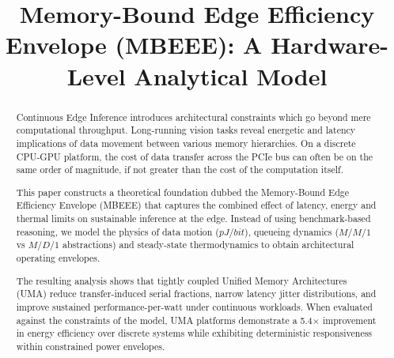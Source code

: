 \documentclass[conference]{IEEEtran}
\begin{document}
\title{Memory-Bound Edge Efficiency Envelope (MBEEE): A Hardware-Level Analytical Model}

\author{
}

\maketitle

\begin{abstract}
Continuous Edge Inference introduces architectural constraints which go beyond mere computational throughput. Long-running vision tasks reveal energetic and latency implications of data movement between various memory hierarchies. On a discrete CPU-GPU platform, the cost of data transfer across the PCIe bus can often be on the same order of magnitude, if not greater than the cost of the computation itself.

This paper constructs a theoretical foundation dubbed the Memory-Bound Edge Efficiency Envelope (MBEEE) that captures the combined effect of latency, energy and thermal limits on sustainable inference at the edge. Instead of using benchmark-based reasoning, we model the physics of data motion ($pJ/bit$), queueing dynamics ($M/M/1$ vs $M/D/1$ abstractions) and steady-state thermodynamics to obtain architectural operating envelopes.

The resulting analysis shows that tightly coupled Unified Memory Architectures (UMA) reduce transfer-induced serial fractions, narrow latency jitter distributions, and improve sustained performance-per-watt under continuous workloads. When evaluated against the constraints of the model, UMA platforms demonstrate a 5.4$\times$ improvement in energy efficiency over discrete systems while exhibiting deterministic responsiveness within constrained power envelopes.
\end{abstract}
\end{document}
